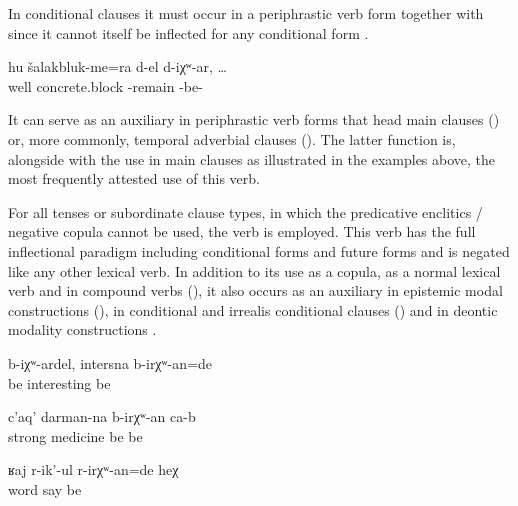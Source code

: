 In conditional clauses it must occur in a periphrastic verb form together with  since it cannot itself be inflected for any conditional form .
%
\begin{exe}
	\ex	\label{ex:If the concrete blocks remained (are left over)}
	\gll	hu		šalakbluk-me=ra	d-el	d-iχʷ-ar,	\ldots\\
		well		concrete.block	-remain\tsc{.pfv}	-be-\\
	\glt	{}
\end{exe}

It can serve as an auxiliary in periphrastic verb forms that head main clauses () or, more commonly, temporal adverbial clauses (). The latter function is, alongside with the use in main clauses as illustrated in the examples above, the most frequently attested use of this verb.

For all tenses or subordinate clause types, in which the predicative enclitics / negative copula cannot be used, the verb   is employed. This verb has the full inflectional paradigm including conditional forms  and future forms  and is negated like any other lexical verb. In addition to its use as a copula, as a normal lexical verb and in compound verbs (), it also occurs as an auxiliary in epistemic modal constructions (), in conditional and irrealis conditional clauses () and in deontic modality constructions .
%
\begin{exe}
	\ex	\label{ex:If it would be like this, it would be interesting}
	\gll	b-iχʷ-ardel,	intersna	b-irχʷ-an=de\\
		be	interesting	be\\
	\glt	{}

	\ex	\label{ex:It will be a strong medicine}
	\gll	c'aq'	darman-na	b-irχʷ-an	ca-b\\
		strong	medicine be	be\\
	\glt	{}

	\ex	\label{ex:She must have been quarreling}
	\gll	ʁaj	r-ik'-ul	r-irχʷ-an=de 	heχ\\
		word	say 	be 	\\
	\glt	{}
\end{exe}

